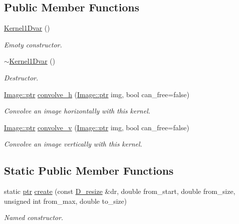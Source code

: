\subsection*{Public Member Functions}
\begin{DoxyCompactItemize}
\item 
\hyperlink{class_photo_finish_1_1_kernel1_dvar_a69e0ed72b582b8b0a524e4e034f17870}{Kernel1\+Dvar} ()
\begin{DoxyCompactList}\small\item\em Emoty constructor. \end{DoxyCompactList}\item 
\hyperlink{class_photo_finish_1_1_kernel1_dvar_ad98ed4957d3d423df0b27e65bca2b80e}{$\sim$\+Kernel1\+Dvar} ()
\begin{DoxyCompactList}\small\item\em Destructor. \end{DoxyCompactList}\item 
\hyperlink{class_photo_finish_1_1_image_ab336203305ed3a1397d7245063353b5a}{Image\+::ptr} \hyperlink{class_photo_finish_1_1_kernel1_dvar_a054d97ccc9d64ca9f334a376fc2473f8}{convolve\+\_\+h} (\hyperlink{class_photo_finish_1_1_image_ab336203305ed3a1397d7245063353b5a}{Image\+::ptr} img, bool can\+\_\+free=false)
\begin{DoxyCompactList}\small\item\em Convolve an image horizontally with this kernel. \end{DoxyCompactList}\item 
\hyperlink{class_photo_finish_1_1_image_ab336203305ed3a1397d7245063353b5a}{Image\+::ptr} \hyperlink{class_photo_finish_1_1_kernel1_dvar_ad5b577268418278d8b3a62234c1de5a6}{convolve\+\_\+v} (\hyperlink{class_photo_finish_1_1_image_ab336203305ed3a1397d7245063353b5a}{Image\+::ptr} img, bool can\+\_\+free=false)
\begin{DoxyCompactList}\small\item\em Convolve an image vertically with this kernel. \end{DoxyCompactList}\end{DoxyCompactItemize}
\subsection*{Static Public Member Functions}
\begin{DoxyCompactItemize}
\item 
static \hyperlink{class_photo_finish_1_1_kernel1_dvar_a5e4ab77c4e5998cfb7341514a4f8fea8}{ptr} \hyperlink{class_photo_finish_1_1_kernel1_dvar_ab5dd67e18a601eb8aaa9b9bc1964da58}{create} (const \hyperlink{class_photo_finish_1_1_d__resize}{D\+\_\+resize} \&dr, double from\+\_\+start, double from\+\_\+size, unsigned int from\+\_\+max, double to\+\_\+size)
\begin{DoxyCompactList}\small\item\em Named constructor. \end{DoxyCompactList}\end{DoxyCompactItemize}
